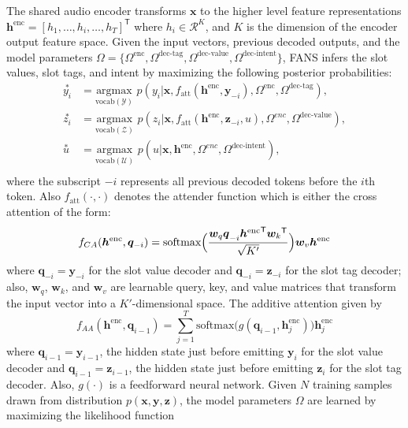 \documentclass[a4paper]{article}
\begin{document}
The shared audio encoder  transforms $\bm{x}$ to the  higher level feature representations $\bm{h}^{\text{enc}}= [h_1,\ldots,h_i,\ldots,h_T]^\mathsf{T}$  where $h_i \in \mathcal{R}^K$, and $K$ is the dimension of the  encoder output feature space.    Given the input vectors, previous decoded outputs, and the model parameters $\Omega=\{\Omega^{\text{enc}},\Omega^{\text{dec-tag}},\Omega^{\text{dec-value}},\Omega^{\text{dec-intent}}\}$, FANS infers the slot values, slot tags, and intent by maximizing the following posterior probabilities: 
 \begin{equation}
 \begin{aligned}
\overset{*}{y_i}& = \underset{\text{vocab}(\mathcal{Y})}{\text{argmax}} \,\, p(y_i |\bm{x},f_{\text{att}}(\bm{h}^{\text{enc}},{\bm{y}}_{-i}),\Omega^{\text{enc}},\Omega^{\text{dec-tag}}),\\
\overset{*}{z_i} &= \underset{\text{vocab}(\mathcal{Z})}{\text{argmax}} \,\, p(z_i |\bm{x},f_{\text{att}}(\bm{h}^{\text{enc}},{\bm{z}}_{-i},u),\Omega^{enc},\Omega^{\text{dec-value}}),\\
 \overset{*}{u} &= \underset{\text{vocab}(\mathcal{U})}{\text{argmax}} \,\, p(u |\bm{x},\bm{h}^{\text{enc}},\Omega^{enc},\Omega^{\text{dec-intent}}),\\
 \end{aligned}
 \end{equation}
 where the subscript $-i$ represents all previous decoded tokens before the $i$th token. Also $f_{\text{att}}(\cdot,\cdot)$ denotes the attender function which is either the cross attention of the form:
 \begin{equation}
 f_{CA}(\bm{h}^{\text{enc}},{\bm{q}}_{-i}) = \text{softmax}\Bigl( \frac{{\bm{w}_q\bm{q}}_{-i}{\bm{h}^{\text{enc}}}^\mathsf{T}{\bm{w}_k}^\mathsf{T}}{\sqrt{K'}}\Bigr)\bm{w}_v\bm{h}^{\text{enc}}
 \end{equation}
where ${\bm{q}}_{-i}= {\bm{y}}_{-i}$ for the slot value decoder and ${\bm{q}}_{-i}= {\bm{z}}_{-i}$ for the slot tag decoder; also, $\bm{w}_q$, $\bm{w}_k$, and $\bm{w}_v$ are learnable query, key, and value matrices that transform the input vector into a  $K'$-dimensional space. The additive attention  given by 
\begin{equation}
 f_{AA}(\bm{h}^{\text{enc}},{\bm{q}}_{i-1}) =  \sum_{j=1}^{T} \text{softmax}\bigl(g({\bm{q}}_{i-1},\bm{h}^{\text{enc}}_{j})\bigr) \bm{h}^{\text{enc}}_{j}
 \end{equation}
 where ${\bm{q}}_{i-1}= {\bm{y}}_{i-1}$, the hidden state just before emitting ${\bm{y}}_{i}$ for  the slot value decoder and ${\bm{q}}_{i-1}= {\bm{z}}_{i-1}$, the hidden state just before emitting ${\bm{z}}_{i}$ for  the slot tag decoder. Also,  $g(\cdot)$ is a feedforward neural network. Given $N$ training samples drawn from distribution $p(\bm{x},\bm{y},\bm{z})$, the model parameters $\Omega$ are learned by maximizing the likelihood function
\end{document}
